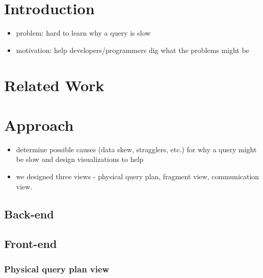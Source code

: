 \documentclass{chi2009}
\begin{document}


\section{Introduction}

\begin{itemize}
    \item problem: hard to learn why a query is slow
    \item motivation: help developers/programmers dig what the problems might be
\end{itemize}


\section{Related Work}



\section{Approach}



\begin{itemize}
    \item determine possible causes (data skew, stragglers, etc.) for why a query might be slow and design visualizations to
help
    \item we designed three views - physical query plan, fragment view, communication view.
\end{itemize}

\subsection{Back-end}


\subsection{Front-end}


\subsubsection{Physical query plan view}
\end{document}
